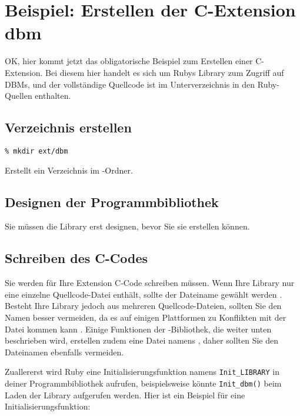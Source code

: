\chapter{Beispiel: Erstellen der C-Extension dbm}
\label{cha:beispiel-dbm}


OK, hier kommt jetzt das obligatorische Beispiel zum Erstellen einer
C-Extension. Bei diesem hier handelt es sich um Rubys Library zum
Zugriff auf DBMs, und der vollständige Quellcode ist im
Unterverzeichnis  in den Ruby-Quellen enthalten.

\section{Verzeichnis erstellen}
\label{sec:verzeichnis}

\begin{verbatim}
% mkdir ext/dbm
\end{verbatim}
Erstellt ein Verzeichnis im -Ordner.

\section{Designen der Programmbibliothek}
\label{sec:design}

Sie müssen die Library erst designen, bevor Sie sie erstellen
können.

\section{Schreiben des C-Codes}
\label{sec:c-code}

Sie werden für Ihre Extension C-Code schreiben müssen. Wenn Ihre
Library nur eine einzelne Quellcode-Datei enthält, sollte der
Dateiname  gewählt werden . Besteht Ihre
Library jedoch aus mehreren Quellcode-Dateien, sollten Sie den Namen
 besser vermeiden, da es auf einigen Plattformen zu
Konflikten mit der Datei  kommen kann . Einige Funktionen der -Bibliothek, die weiter
unten beschrieben wird, erstellen zudem eine Datei namens
, daher sollten Sie den Dateinamen
 ebenfalls vermeiden.

Zuallererst wird Ruby eine Initialisierungsfunktion namens
\verb+Init_LIBRARY+ in deiner Programmbibliothek aufrufen,
beispielsweise könnte \verb+Init_dbm()+ beim Laden der Library
aufgerufen werden. Hier ist ein Beispiel für eine
Initialisierungsfunktion:

